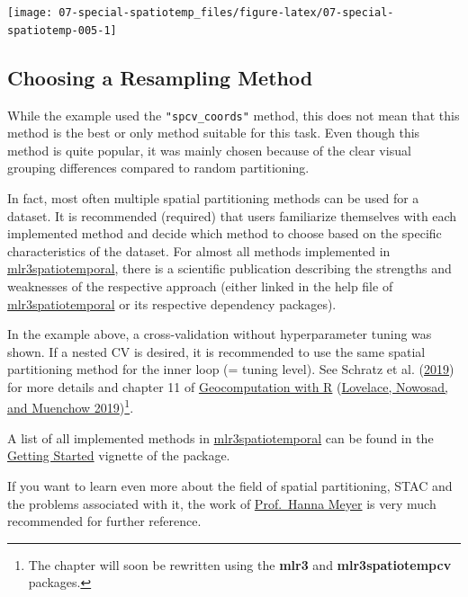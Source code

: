 \documentclass[
]{scrbook}
\begin{document}
\begin{center}\texttt{[image: 07-special-spatiotemp\_files/figure-latex/07-special-spatiotemp-005-1]} \end{center}

\hypertarget{choose-spt-rsmp}{%
\subsection{Choosing a Resampling Method}\label{choose-spt-rsmp}}

While the example used the \texttt{"spcv\_coords"} method, this does not mean that this method is the best or only method suitable for this task.
Even though this method is quite popular, it was mainly chosen because of the clear visual grouping differences compared to random partitioning.

In fact, most often multiple spatial partitioning methods can be used for a dataset.
It is recommended (required) that users familiarize themselves with each implemented method and decide which method to choose based on the specific characteristics of the dataset.
For almost all methods implemented in \href{https://github.com/mlr-org/mlr3spatiotemporal}{mlr3spatiotemporal}, there is a scientific publication describing the strengths and weaknesses of the respective approach (either linked in the help file of \href{https://github.com/mlr-org/mlr3spatiotemporal}{mlr3spatiotemporal} or its respective dependency packages).

In the example above, a cross-validation without hyperparameter tuning was shown.
If a nested CV is desired, it is recommended to use the same spatial partitioning method for the inner loop (= tuning level).
See Schratz et al. (\protect\hyperlink{ref-schratz2019}{2019}) for more details and chapter 11 of \href{https://geocompr.robinlovelace.net/spatial-cv.html}{Geocomputation with R} (\protect\hyperlink{ref-lovelace2019}{Lovelace, Nowosad, and Muenchow 2019})\footnote{The chapter will soon be rewritten using the \textbf{mlr3} and \textbf{mlr3spatiotempcv} packages.}.

A list of all implemented methods in \href{https://github.com/mlr-org/mlr3spatiotemporal}{mlr3spatiotemporal} can be found in the \href{https://mlr3spatiotempcv.mlr-org.com/articles/mlr3spatiotempcv.html\#resampling-methods}{Getting Started} vignette of the package.

If you want to learn even more about the field of spatial partitioning, STAC and the problems associated with it, the work of \href{https://scholar.google.com/citations?user=9YibxW0AAAAJ\&hl=en}{Prof.~Hanna Meyer} is very much recommended for further reference.
\end{document}
